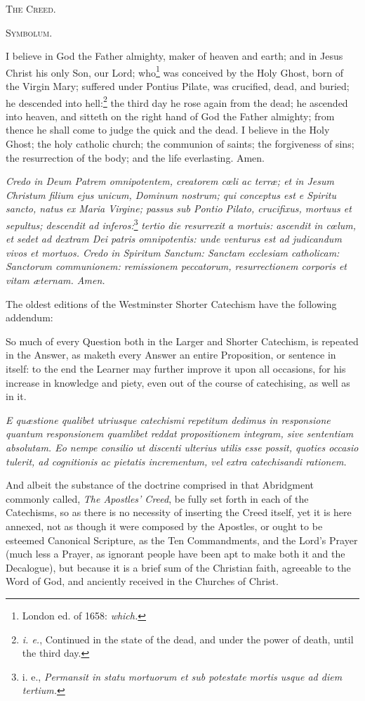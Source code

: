 T\textsc{he} C\textsc{reed}.

S\textsc{ymbolum.}

I believe in God the Father almighty, maker of heaven and earth; and in Jesus Christ his only Son, our Lord; who\footnote{London ed. of 1658: \emph{which.}} was conceived by the Holy Ghost, born of the Virgin Mary; suffered under Pontius Pilate, was crucified, dead, and buried; he descended into hell:\footnote{\emph{i. e.}, Continued in the state of the dead, and under the power of death, until the third day.} the third day he rose again from the dead; he ascended into heaven, and sitteth on the right hand of God the Father almighty; from thence he shall come to judge the quick and the dead. I believe in the Holy Ghost; the holy catholic church; the communion of saints; the forgiveness of sins; the resurrection of the body; and the life everlasting. Amen.

\emph{Credo in Deum Patrem omnipotentem, creatorem cœli ac terræ; et in Jesum Christum filium ejus unicum, Dominum nostrum; qui conceptus est e Spiritu sancto, natus ex Maria Virgine; passus sub Pontio Pilato, crucifixus, mortuus et sepultus; descendit ad inferos:}\footnote{i. e., \emph{Permansit in statu mortuorum et sub potestate mortis usque ad diem tertium.}} \emph{ tertio die resurrexit a mortuis: ascendit in cœlum, et sedet ad dextram Dei patris omnipotentis: unde venturus est ad judicandum vivos et mortuos. Credo in Spiritum Sanctum: Sanctam ecclesiam catholicam: Sanctorum communionem: remissionem peccatorum, resurrectionem corporis et vitam æternam. Amen.}

The oldest editions of the Westminster Shorter Catechism have the following addendum:

So much of every Question both in the Larger and Shorter Catechism, is repeated in the Answer, as maketh every Answer an entire Proposition, or sentence in itself: to the end the Learner may further improve it upon all occasions, for his increase in knowledge and piety, even out of the course of catechising, as well as in it.

\emph{E quæstione qualibet utriusque catechismi repetitum dedimus in responsione quantum responsionem quamlibet reddat propositionem integram, sive sententiam absolutam. Eo nempe consilio ut discenti ulterius utilis esse possit, quoties occasio tulerit, ad cognitionis ac pietatis incrementum, vel extra catechisandi rationem.}

And albeit the substance of the doctrine comprised in that Abridgment commonly called, \emph{The Apostles' Creed}, be fully set forth in each of the Catechisms, so as there is no necessity of inserting the Creed itself, yet it is here annexed, not as though it were composed by the Apostles, or ought to be esteemed Canonical Scripture, as the Ten Commandments, and the Lord's Prayer (much less a Prayer, as ignorant people have been apt to make both it and the Decalogue), but because it is a brief sum of the Christian faith, agreeable to the Word of God, and anciently received in the Churches of Christ.

